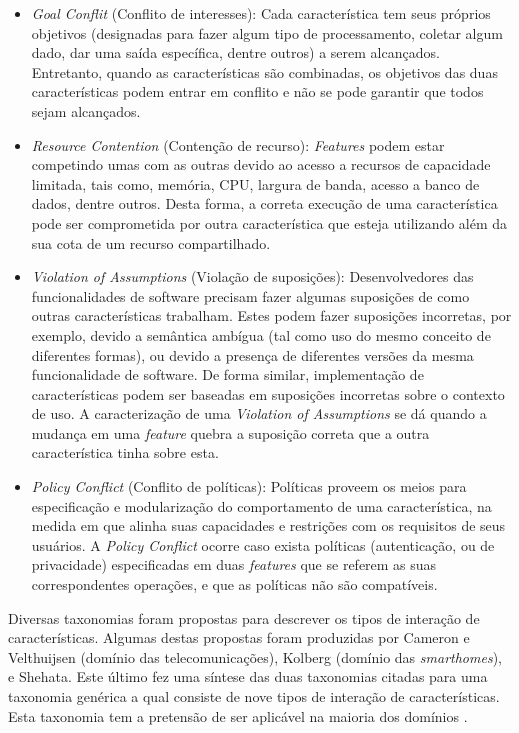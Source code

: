\begin{itemize}
\item \textit{Goal Conflit} (Conflito de interesses): Cada característica tem seus próprios objetivos (designadas para fazer algum tipo de processamento, coletar algum dado, dar uma saída específica, dentre outros) a serem alcançados. Entretanto, quando as características são combinadas, os objetivos das duas características podem entrar em conflito e não se pode garantir que todos sejam alcançados. 
\item \textit{Resource Contention} (Contenção de recurso): \textit{Features} podem estar competindo umas com as outras devido ao acesso a recursos de capacidade limitada, tais como, memória, CPU, largura de banda, acesso a banco de dados, dentre outros. Desta forma, a correta execução de uma característica pode ser comprometida por outra característica que esteja utilizando além da sua cota de um recurso compartilhado.
\item \textit{Violation of Assumptions} (Violação de suposições): Desenvolvedores das funcionalidades de software precisam fazer algumas suposições de como outras características trabalham. Estes podem fazer suposições incorretas, por exemplo, devido a semântica ambígua (tal como uso do mesmo conceito de diferentes formas), ou devido a presença de diferentes versões da mesma funcionalidade de software. De forma similar, implementação de características podem ser baseadas em suposições incorretas sobre o contexto de uso. A caracterização de uma  \textit{Violation of Assumptions} se dá quando a mudança em uma \textit{feature} quebra a suposição correta que a outra característica tinha sobre esta.
\item \textit{Policy Conflict} (Conflito de políticas): Políticas proveem os meios para especificação e modularização do comportamento de uma característica, na medida em que alinha suas capacidades e restrições com os requisitos de seus usuários. A \textit{Policy Conflict} ocorre caso exista políticas (autenticação, ou de privacidade) especificadas em duas \textit{features} que se referem as suas correspondentes operações, e que as políticas não são compatíveis.
\end{itemize}

Diversas taxonomias foram propostas para descrever os tipos de interação de características. Algumas destas propostas foram produzidas por Cameron e Velthuijsen (domínio das telecomunicações), Kolberg (domínio das \textit{smarthomes}), e Shehata. Este último fez uma síntese das duas taxonomias citadas para uma taxonomia genérica a qual consiste de nove tipos de interação de características. Esta taxonomia tem a pretensão de ser aplicável na maioria dos domínios \cite{NHLABATSI:2008}.

